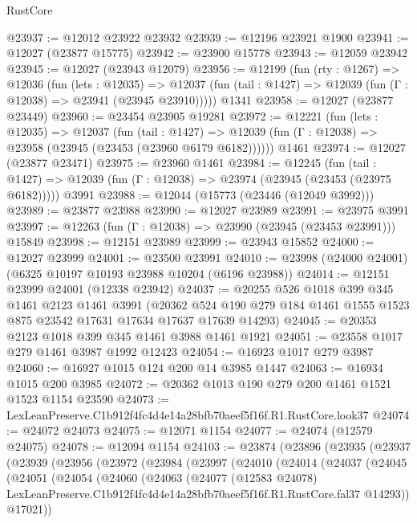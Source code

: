 \begin{lexlean}{RustCore}
\begin{coremodule}
@23937 := @12012 @23922 @23932
@23939 := @12196 @23921 @1900
@23941 := @12027 (@23877 @15775)
@23942 := @23900 @15778
@23943 := @12059 @23942
@23945 := @12027 (@23943 @12079)
@23956 := @12199
    (fun (rty : @1267) =>
    @12036
      (fun (lets : @12035) =>
      @12037 (fun (tail : @1427) => @12039 (fun (Γ : @12038) => @23941 (@23945 @23910)))))
    @1341
@23958 := @12027 (@23877 @23449)
@23960 := @23454 @23905 @19281
@23972 := @12221
    (fun (lets : @12035) =>
    @12037
      (fun (tail : @1427) =>
      @12039 (fun (Γ : @12038) => @23958 (@23945 (@23453 (@23960 @6179 @6182))))))
    @1461
@23974 := @12027 (@23877 @23471)
@23975 := @23960 @1461
@23984 := @12245
    (fun (tail : @1427) => @12039 (fun (Γ : @12038) => @23974 (@23945 (@23453 (@23975 @6182)))))
    @3991
@23988 := @12044 (@15773 (@23446 (@12049 @3992)))
@23989 := @23877 @23988
@23990 := @12027 @23989
@23991 := @23975 @3991
@23997 := @12263 (fun (Γ : @12038) => @23990 (@23945 (@23453 @23991))) @15849
@23998 := @12151 @23989
@23999 := @23943 @15852
@24000 := @12027 @23999
@24001 := @23500 @23991
@24010 := @23998 (@24000 @24001) (@6325 @10197 @10193 @23988 @10204 (@6196 @23988))
@24014 := @12151 @23999 @24001 (@12338 @23942)
@24037 := @20255
    @526
    @1018
    @399
    @345
    @1461
    @2123
    @1461
    @3991
    (@20362 @524 @190 @279 @184 @1461 @1555 @1523 @875 @23542 @17631 @17634 @17637 @17639 @14293)
@24045 := @20353 @2123 @1018 @399 @345 @1461 @3988 @1461 @1921
@24051 := @23558 @1017 @279 @1461 @3987 @1992 @12423
@24054 := @16923 @1017 @279 @3987
@24060 := @16927 @1015 @124 @200 @14 @3985 @1447
@24063 := @16934 @1015 @200 @3985
@24072 := @20362 @1013 @190 @279 @200 @1461 @1521 @1523 @1154 @23590
@24073 := LexLeanPreserve.C1b912f4fc4d4e14a28bfb70aeef5f16f.R1.RustCore.look37
@24074 := @24072 @24073
@24075 := @12071 @1154
@24077 := @24074 (@12579 @24075)
@24078 := @12094 @1154
@24103 := @23874
    (@23896
      (@23935
        (@23937
          (@23939
            (@23956
              (@23972
                (@23984
                  (@23997
                    (@24010
                      (@24014
                        (@24037
                          (@24045
                            (@24051
                              (@24054
                                (@24060
                                  (@24063
                                    (@24077
                                      (@12583 @24078)
                                      LexLeanPreserve.C1b912f4fc4d4e14a28bfb70aeef5f16f.R1.RustCore.fal37
                                      @14293))
                                  @17021))

\end{coremodule}
\end{lexlean}
